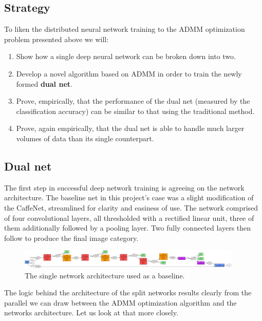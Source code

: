 \documentclass[a4paper, 12pt]{article}
\numberwithin{equation}{section}
\begin{document}
	\subsection{Strategy}

	To liken the distributed neural network training to the ADMM optimization problem presented above we will:
	\begin{enumerate}
		\item Show how a single deep neural network can be broken down into two.
		\item Develop a novel algorithm based on ADMM in order to train the newly formed \textbf{dual net}.
		\item Prove, empirically, that the performance of the dual net (measured by the classification accuracy) can be similar to that using the traditional method.
		\item Prove, again empirically, that the dual net is able to handle much larger volumes of data than its single counterpart.
	\end{enumerate}

	\subsection{Dual net}

	The first step in successful deep network training is agreeing on the network architecture. The baseline net in this project's case was a slight modification of the CaffeNet, streamlined for clarity and easiness of use. The network comprised of four convolutional layers, all thresholded with a rectified linear unit, three of them additionally followed by a pooling layer. Two fully connected layers then follow to produce the final image category.

	\begin{figure}[!h]
		\centering
		\includegraphics[page=1,width=0.95\textwidth]{net12.png}
		\caption{\label{fig:net12}{The single network architecture used as a baseline.}}
	\end{figure}

	The logic behind the architecture of the split networks results clearly from the parallel we can draw between the ADMM optimization algorithm and the networks architecture. Let us look at that more closely.
\end{document}
